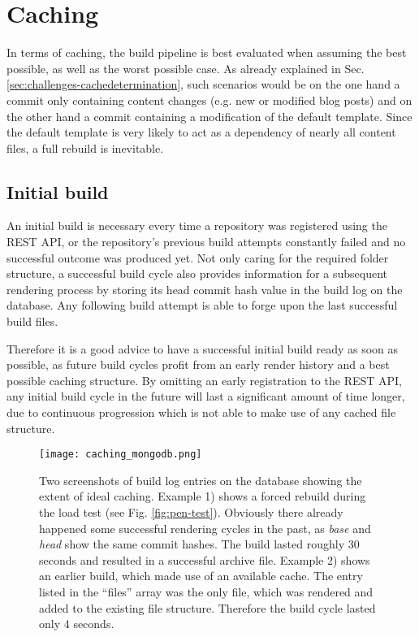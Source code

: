\section{Caching}
\label{sec:caching}

In terms of caching, the build pipeline is best evaluated when assuming the best possible, as well as the worst possible case. As already explained in Sec. \ref{sec:challenges-cachedetermination}, such scenarios would be on the one hand a commit only containing content changes (e.g. new or modified blog posts) and on the other hand a commit containing a modification of the default template. Since the default template is very likely to act as a dependency of nearly all content files, a full rebuild is inevitable.

\subsection{Initial build}
An initial build is necessary every time a repository was registered using the REST API, or the repository's previous build attempts constantly failed and no successful outcome was produced yet. Not only caring for the required folder structure, a successful build cycle also provides information for a subsequent rendering process by storing its head commit hash value in the build log on the database. Any following build attempt is able to forge upon the last successful build files.

Therefore it is a good advice to have a successful initial build ready as soon as possible, as future build cycles profit from an early render history and a best possible caching structure. By omitting an early registration to the REST API, any initial build cycle in the future will last a significant amount of time longer, due to continuous progression which is not able to make use of any cached file structure.

\begin{figure} %
    \centering
    \texttt{[image: caching\_mongodb.png]}
    \caption{Two screenshots of build log entries on the database showing the extent of ideal caching. Example 1) shows a forced rebuild during the load test (see Fig. \ref{fig:pen-test}). Obviously there already happened some successful rendering cycles in the past, as \emph{base} and \emph{head} show the same commit hashes. The build lasted roughly 30 seconds and resulted in a successful archive file. Example 2) shows an earlier build, which made use of an available cache. The entry listed in the ``files'' array was the only file, which was rendered and added to the existing file structure. Therefore the build cycle lasted only 4 seconds.}
    \label{fig:caching-mongodb}
\end{figure}
%

